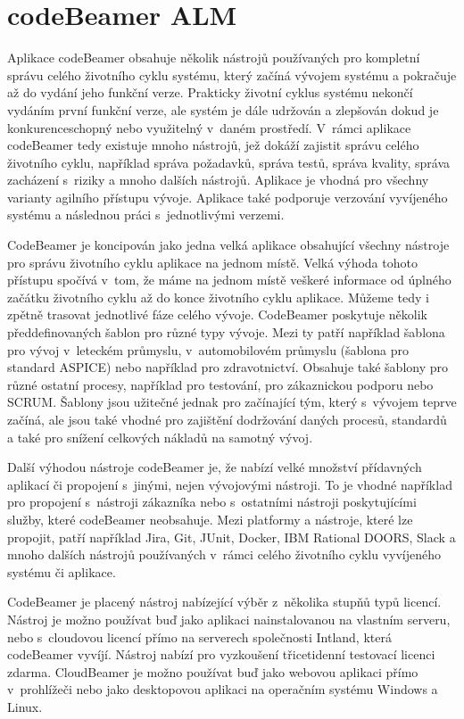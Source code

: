 \documentclass[czech,master]{diploma}
\begin{document}
\section{codeBeamer ALM}
\label{sec:codebeamer}
Aplikace codeBeamer obsahuje několik nástrojů používaných pro kompletní správu celého životního cyklu systému, který začíná vývojem systému a pokračuje až do vydání jeho funkční verze. Prakticky životní cyklus systému nekončí vydáním první funkční verze, ale systém je dále udržován a zlepšován dokud je konkurenceschopný nebo využitelný v~daném prostředí. V~rámci aplikace codeBeamer tedy existuje mnoho nástrojů, jež dokáží zajistit správu celého životního cyklu, například správa požadavků, správa testů, správa kvality, správa zacházení s~riziky a mnoho dalších nástrojů. Aplikace je vhodná pro všechny varianty agilního přístupu vývoje. Aplikace také podporuje verzování vyvíjeného systému a následnou práci s~jednotlivými verzemi. \cite{ref:about_codebeamer}

CodeBeamer je koncipován jako jedna velká aplikace obsahující všechny nástroje pro správu životního cyklu aplikace na jednom místě. Velká výhoda tohoto přístupu spočívá v~tom, že máme na jednom místě veškeré informace od úplného začátku životního cyklu až do konce životního cyklu aplikace. Můžeme tedy i zpětně trasovat jednotlivé fáze celého vývoje. CodeBeamer poskytuje několik předdefinovaných šablon pro různé typy vývoje. Mezi ty patří například šablona pro vývoj v~leteckém průmyslu, v~automobilovém průmyslu (šablona pro standard ASPICE) nebo například pro zdravotnictví. Obsahuje také šablony pro různé ostatní procesy, například pro testování, pro zákaznickou podporu nebo SCRUM.  \cite{ref:codebeamer_templates} Šablony jsou užitečné jednak pro začínající tým, který s~vývojem teprve začíná, ale jsou také vhodné pro zajištění dodržování daných procesů, standardů a také pro snížení celkových nákladů na samotný vývoj.

Další výhodou nástroje codeBeamer je, že nabízí velké množství přídavných aplikací či propojení s~jinými, nejen vývojovými nástroji. To je vhodné například pro propojení s~nástroji zákazníka nebo s~ostatními nástroji poskytujícími služby, které codeBeamer neobsahuje. Mezi platformy a nástroje, které lze propojit, patří například Jira, Git, JUnit, Docker, IBM Rational DOORS, Slack a mnoho dalších nástrojů používaných v~rámci celého životního cyklu vyvíjeného systému či aplikace.

CodeBeamer je placený nástroj nabízející výběr z~několika stupňů typů licencí.  Nástroj je možno používat buď jako aplikaci nainstalovanou na vlastním serveru, nebo s~cloudovou licencí přímo na serverech společnosti Intland, která codeBeamer vyvíjí. Nástroj nabízí pro vyzkoušení třicetidenní testovací licenci zdarma. CloudBeamer je možno používat buď jako webovou aplikaci přímo v~prohlížeči nebo jako desktopovou aplikaci na operačním systému Windows a Linux. \cite{ref:codebeamer_pricing}
\end{document}
